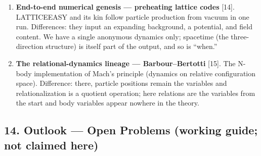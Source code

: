 \documentclass[
  a4paper,
]{article}
\begin{document}
\begin{enumerate}
  aggregates edge variables at nodes with self-subtraction (four ledgers
  including the anomalous \(z^2\)), and the basis of exactness is
  anonymity (absence of pair-specific constants).
\item
  \textbf{End-to-end numerical genesis --- preheating lattice codes}
  {[}14{]}. LATTICEEASY and its kin follow particle production from
  vacuum in one run. Differences: they input an expanding background, a
  potential, and field content. We have a single anonymous dynamics
  only; spacetime (the three-direction structure) is itself part of the
  output, and so is ``when.''
\item
  \textbf{The relational-dynamics lineage --- Barbour--Bertotti}
  {[}15{]}. The N-body implementation of Mach's principle (dynamics on
  relative configuration space). Difference: there, particle positions
  remain the variables and relationalization is a quotient operation;
  here relations are the variables from the start and body variables
  appear nowhere in the theory.
\end{enumerate}

\subsection{14. Outlook --- Open Problems (working guide; not claimed
here)}\label{outlook-open-problems-working-guide-not-claimed-here}
\end{document}
